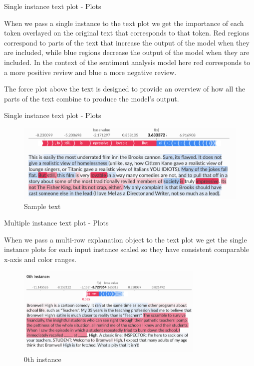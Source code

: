 \documentclass[aspectratio=169]{beamer}
\begin{document}
\begin{frame}{Single instance text plot - Plots}

When we pass a single instance to the text plot we get the importance of each token overlayed on the original text that corresponds to that token. Red regions correspond to parts of the text that increase the output of the model when they are included, while blue regions decrease the output of the model when they are included. In the context of the sentiment analysis model here red corresponds to a more positive review and blue a more negative review.

The force plot above the text is designed to provide an overview of how all the parts of the text combine to produce the model’s output.
\end{frame}


\begin{frame}{Single instance text plot - Plots}

    \begin{figure}[htbp]
        \centering
        \includegraphics[width=1\textwidth]{figs/shap/plots/text/sample_text.png}
        \caption{Sample text}
        \label{fig:sample-text}
    \end{figure}
\end{frame}

\begin{frame}{Multiple instance text plot - Plots}

When we pass a multi-row explanation object to the text plot we get the single instance plots for each input instance scaled so they have consistent comparable x-axis and color ranges.

    \begin{figure}[htbp]
        \centering
        \includegraphics[width=0.8\textwidth]{figs/shap/plots/text/sample_text_0th.png}
        \caption{0th instance}
        \label{fig:0th-sample-text}
    \end{figure}
\end{frame}
\end{document}
